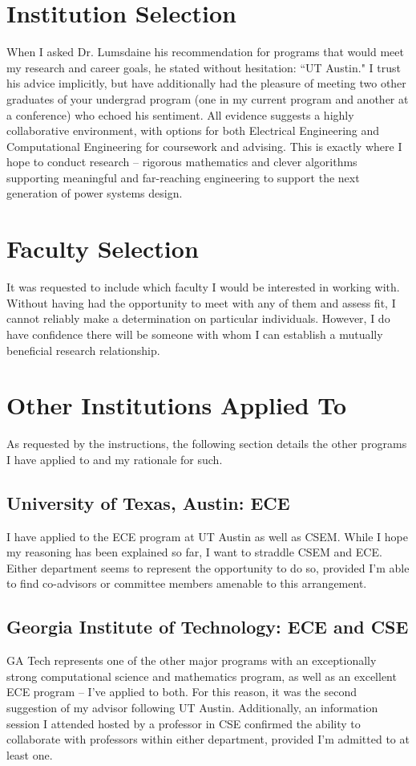 \documentclass[letterpaper]{article}
\begin{document}
\section*{Institution Selection}
When I asked Dr. Lumsdaine his recommendation for programs that would meet my research and career
goals, he stated without hesitation: ``UT Austin." I trust his advice implicitly, but have additionally
had the pleasure of meeting two other graduates of your undergrad program (one in my current
program and another at a conference) who echoed his sentiment. All evidence suggests a highly
collaborative environment, with options for both Electrical Engineering and Computational Engineering
for coursework and advising. This is exactly where I hope to conduct research -- rigorous mathematics
and clever algorithms supporting meaningful and far-reaching engineering to support the next
generation of power systems design.

\section*{Faculty Selection}
It was requested to include which faculty I would be interested in working with. Without having
had the opportunity to meet with any of them and assess fit, I cannot reliably make a
determination on particular individuals. However, I do have confidence there will be someone
with whom I can establish a mutually beneficial research relationship.


\section*{Other Institutions Applied To}
As requested by the instructions, the following section details the other programs I have
applied to and my rationale for such.

\subsection*{University of Texas, Austin: ECE}
I have applied to the ECE program at UT Austin as well as CSEM. While I hope my reasoning
has been explained so far, I want to straddle CSEM and ECE. Either department seems
to represent the opportunity to do so, provided I'm able to find co-advisors or committee
members amenable to this arrangement.

\subsection*{Georgia Institute of Technology: ECE and CSE}
GA Tech represents one of the other major programs with an exceptionally strong computational
science and mathematics program, as well as an excellent ECE program -- I've applied to both.
For this reason, it was the second suggestion of my advisor following UT Austin.
Additionally, an information session I attended hosted by a professor in CSE confirmed the
ability to collaborate with professors within either department, provided I'm admitted to at
least one.
\end{document}
